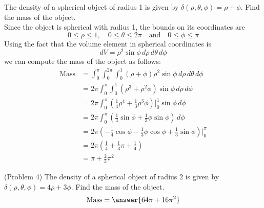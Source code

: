 \documentclass[handout]{ximera}
\begin{document}
\begin{example}[Example 4]
The density of a spherical object of radius 1 is given by $\delta(\rho, \theta, \phi) = \rho + \phi$. Find the mass of the object.\\
Since the object is spherical with radius 1, the bounds on its coordinates are
\[
0\leq \rho \leq 1, \quad 0 \leq \theta \leq 2\pi \quad \text{and} \quad 0\leq \phi \leq \pi
\]
Using the fact that the volume element in spherical coordinates is 
\[
dV = \rho^2 \sin\phi \, d\rho\, d\theta\, d\phi
\]
we can compute the mass of the object as follows:
\begin{align*}
\text{Mass} &= \int_0^\pi \int_0^{2\pi}  \int_0^1 (\rho + \phi) \rho^2 \sin \phi  \, d\rho\, d\theta\, d\phi\\
            &= 2\pi \int_0^\pi \int_0^1 (\rho^3 + \rho^2\phi)  \sin \phi  \, d\rho\, d\phi\\
            &= 2\pi \int_0^\pi \left(\tfrac14\rho^4 + \tfrac13\rho^3 \phi\right) \bigg|_0^1 \sin \phi \, d\phi\\
            &=2 \pi \int_0^\pi \left(\tfrac14 \sin \phi + \tfrac13 \phi \sin \phi\right) \, d\phi\\
            &= 2\pi \left(-\tfrac14 \cos \phi -\tfrac13 \phi \cos \phi + \tfrac13\sin\phi \right)\bigg|_0^\pi\\
            &=2\pi \left(\tfrac14 + \tfrac13 \pi +\tfrac14 \right)\\
            &= \pi + \tfrac{2 }{3}\pi^2
\end{align*}
\end{example}

\begin{problem}(Problem 4)
The density of a spherical object of radius 2 is given by $\delta(\rho, \theta, \phi) = 4\rho + 3\phi$. Find the mass of the object.\\
\[
\text{Mass} = \answer{64\pi + 16\pi^2}
\]
\end{problem}
            
\end{document}

